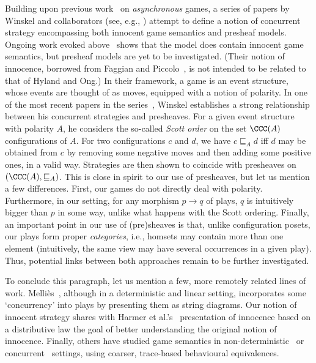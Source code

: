 \documentclass{LMCS}
\theoremstyle{plain}\newtheorem{satz}[thm]{Satz}
\begin{document}
Building upon previous
work~\cite{DBLP:conf/lics/AbramskyM99,Mellies04,DBLP:conf/concur/MelliesM07}
on \emph{asynchronous} games, a series of papers by Winskel and
collaborators (see, e.g., \citet{RideauW,DBLP:conf/fossacs/Winskel13})
attempt to define a notion of concurrent strategy encompassing both
innocent game semantics and presheaf models. Ongoing work evoked
above~\cite{CCWGalop14} shows that the model does contain innocent
game semantics, but presheaf models are yet to be investigated.
(Their notion of innocence, borrowed from Faggian and
Piccolo~\cite{DBLP:conf/tlca/FaggianP09}, is not intended to be
related to that of Hyland and Ong.)  In their framework, a game is an
event structure, whose events are thought of as moves, equipped with a
notion of polarity.  In one of the most recent papers in the
series~\cite{DBLP:conf/fossacs/Winskel13}, Winskel establishes a
strong relationship between his concurrent strategies and presheaves.
For a given event structure with polarity $A$, he considers the
so-called \emph{Scott order} on the set $\CCC(A)$ configurations of
$A$.  For two configurations $c$ and $d$, we have $c \sqsubseteq_A d$
iff $d$ may be obtained from $c$ by removing some negative moves and
then adding some positive ones, in a valid way.  Strategies are then
shown to coincide with presheaves on $(\CCC(A), \sqsubseteq_A)$.  This
is close in spirit to our use of presheaves, but let us mention a few
differences. First, our games do not directly deal with
polarity. Furthermore, in our setting, for any morphism $p \to q$ of
plays, $q$ is intuitively bigger than $p$ in some way, unlike what
happens with the Scott ordering. Finally, an important point in our
use of (pre)sheaves is that, unlike configuration posets, our plays
form proper \emph{categories}, i.e., homsets may contain more than one
element (intuitively, the same view may have several occurrences in a
given play). Thus, potential links between both approaches remain to
be further investigated.

To conclude this paragraph, let us mention a few, more remotely related
lines of work.  Melli\`es~\cite{DBLP:conf/lics/Mellies12}, although in
a deterministic and linear setting, incorporates some `concurrency'
into plays by presenting them as string diagrams. Our notion of
innocent strategy shares with Harmer et
al.'s~\cite{DBLP:conf/lics/HarmerHM07} presentation of innocence based
on a distributive law the goal of better understanding the original
notion of innocence. Finally, others have studied game semantics in
non-deterministic~\cite{DBLP:conf/lics/HarmerM99} or
concurrent~\cite{DBLP:conf/fossacs/GhicaM04,DBLP:conf/fsttcs/Laird06}
settings, using coarser, trace-based behavioural equivalences.
\end{document}

